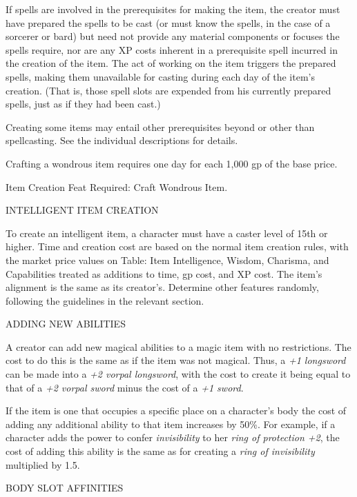 If spells are involved in the prerequisites for making the item, the creator must 
have prepared the spells to be cast (or must know the spells, in the case of a 
sorcerer or bard) but need not provide any material components or focuses the spells 
require, nor are any XP costs inherent in a prerequisite spell incurred in the 
creation of the item. The act of working on the item triggers the prepared spells, 
making them unavailable for casting during each day of the item's creation. (That 
is, those spell slots are expended from his currently prepared spells, just as 
if they had been cast.)

Creating some items may entail other prerequisites beyond or other than spellcasting. 
See the individual descriptions for details.

Crafting a wondrous item requires one day for each 1,000 gp of the base price.

Item Creation Feat Required: Craft Wondrous Item.

\vspace{12pt}
{\large INTELLIGENT ITEM CREATION}

To create an intelligent item, a character must have a caster level of 15th or 
higher. Time and creation cost are based on the normal item creation rules, with 
the market price values on Table: Item Intelligence, Wisdom, Charisma, and Capabilities 
treated as additions to time, gp cost, and XP cost. The item's alignment is the 
same as its creator's. Determine other features randomly, following the guidelines 
in the relevant section.

\vspace{12pt}
{\large ADDING NEW ABILITIES}

A creator can add new magical abilities to a magic item with no restrictions. The 
cost to do this is the same as if the item was not magical. Thus, a \textit{+1 
longsword }can be made into a \textit{+2 vorpal longsword}, with the cost to create 
it being equal to that of a \textit{+2 vorpal sword }minus the cost of a \textit{+1 
sword}.

If the item is one that occupies a specific place on a character's body the cost 
of adding any additional ability to that item increases by 50\%. For example, if 
a character adds the power to confer \textit{invisibility }to her \textit{ring 
of protection +2}, the cost of adding this ability is the same as for creating 
a \textit{ring of invisibility }multiplied by 1.5.

\vspace{12pt}
BODY SLOT AFFINITIES

